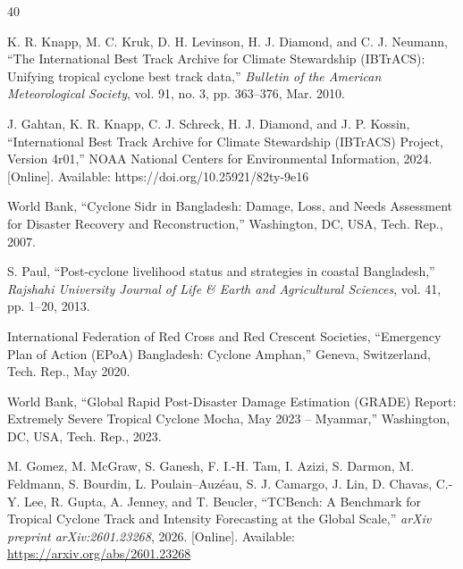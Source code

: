 \documentclass{ametsocv6.1}
\begin{document}
\begin{thebibliography}{40}

K. R. Knapp, M. C. Kruk, D. H. Levinson, H. J. Diamond, and C. J. Neumann, ``The International Best Track Archive for Climate Stewardship (IBTrACS): Unifying tropical cyclone best track data,'' \textit{Bulletin of the American Meteorological Society}, vol. 91, no. 3, pp. 363--376, Mar. 2010.

J. Gahtan, K. R. Knapp, C. J. Schreck, H. J. Diamond, and J. P. Kossin, ``International Best Track Archive for Climate Stewardship (IBTrACS) Project, Version 4r01,'' NOAA National Centers for Environmental Information, 2024. [Online]. Available: https://doi.org/10.25921/82ty-9e16

World Bank, ``Cyclone Sidr in Bangladesh: Damage, Loss, and Needs Assessment for Disaster Recovery and Reconstruction,'' Washington, DC, USA, Tech. Rep., 2007.

S. Paul, ``Post-cyclone livelihood status and strategies in coastal Bangladesh,'' \textit{Rajshahi University Journal of Life \& Earth and Agricultural Sciences}, vol. 41, pp. 1--20, 2013.

International Federation of Red Cross and Red Crescent Societies, ``Emergency Plan of Action (EPoA) Bangladesh: Cyclone Amphan,'' Geneva, Switzerland, Tech. Rep., May 2020.

World Bank, ``Global Rapid Post-Disaster Damage Estimation (GRADE) Report: Extremely Severe Tropical Cyclone Mocha, May 2023 -- Myanmar,'' Washington, DC, USA, Tech. Rep., 2023.


M. Gomez, M. McGraw, S. Ganesh, F. I.-H. Tam, I. Azizi, S. Darmon, M. Feldmann, S. Bourdin, L. Poulain--Auz\'{e}au, S. J. Camargo, J. Lin, D. Chavas, C.-Y. Lee, R. Gupta, A. Jenney, and T. Beucler, ``TCBench: A Benchmark for Tropical Cyclone Track and Intensity Forecasting at the Global Scale,'' \textit{arXiv preprint arXiv:2601.23268}, 2026. [Online]. Available: \url{https://arxiv.org/abs/2601.23268}


\end{thebibliography}
\end{document}
